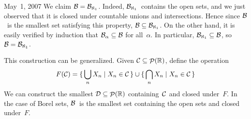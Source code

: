 \begin{lecture}{May~1, 2007}
We claim \(\mathcal{B}=\mathcal{B}_{\aleph_1}\). Indeed, \(\mathcal{B}_{\aleph_1}\)~contains the open sets, and we just observed that it is closed under countable unions and intersections. Hence since \(\mathcal{B}\)~is the smallest set satisfying this property, \(\mathcal{B}\subseteq\mathcal{B}_{\aleph_1}\). On the other hand, it is easily verified by induction that \(\mathcal{B}_{\alpha}\subseteq\mathcal{B}\) for all~\(\alpha\). In particular, \(\mathcal{B}_{\aleph_1}\subseteq\mathcal{B}\), so \(\mathcal{B}=\mathcal{B}_{\aleph_1}\).

This construction can be generalized. Given \(\mathcal{C}\subseteq\mathop{\mathcal{P}}(\mathbb{R})\), define the operation
\[F(\mathcal{C})=\{\,\bigcup_n X_n\mid X_n\in\mathcal{C}\,\}\cup\{\,\bigcap_n X_n\mid X_n\in\mathcal{C}\,\}\]
We can construct the smallest \(\mathcal{D}\subseteq\mathop{\mathcal{P}}(\mathbb{R})\) containing~\(\mathcal{C}\) and closed under~\(F\). In the case of Borel sets, \(\mathcal{B}\)~is the smallest set containing the open sets and closed under~\(F\).
\end{lecture}

